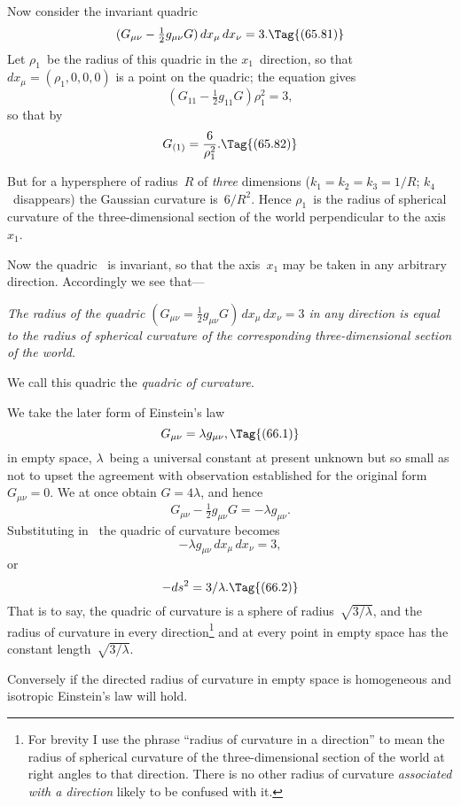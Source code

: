 \documentclass[12pt]{book}
\begin{document}
Now consider the invariant quadric
\[
(G_{\mu\nu} - \tfrac{1}{2} g_{\mu\nu} G)\, dx_{\mu}\, dx_{\nu} = 3.
\Tag{(65.81)}
\]
Let $\rho_{1}$~be the radius of this quadric in the $x_{1}$~direction, so that $dx_{\mu} = (\rho_{1} , 0, 0, 0)$
is a point on the quadric; the equation gives
\[
(G_{11} - \tfrac{1}{2} g_{11}G) \rho_{1}^{2} = 3,
\]
so that by~
\[
G_{(1)} = \frac{6}{\rho_{1}^{2}}.
\Tag{(65.82)}
\]

But for a hypersphere of radius~$R$ of \emph{three} dimensions ($k_{1} = k_{2} = k_{3} = 1/R$;
$k_{4}$~disappears) the Gaussian curvature is~$6/R^{2}$. Hence $\rho_{1}$~is the radius of
spherical curvature of the three\hyp{}dimensional section of the world perpendicular
to the axis~$x_{1}$.

Now the quadric~ is invariant, so that the axis~$x_{1}$ may be taken in
any arbitrary direction. Accordingly we see that---

\emph{The radius of the quadric $(G_{\mu\nu} = \tfrac{1}{2} g_{\mu\nu}G)\, dx_{\mu}\, dx_{\nu} = 3$ in any direction is equal
to the radius of spherical curvature of the corresponding three\hyp{}dimensional
section of the world.}

We call this quadric the \emph{quadric of curvature}.
%


We take the later form of Einstein's law~
\[
G_{\mu\nu} = \lambda g_{\mu\nu},
\Tag{(66.1)}
\]
in empty space, $\lambda$~being a universal constant at present unknown but so small
as not to upset the agreement with observation established for the original
form $G_{\mu\nu} = 0$. We at once obtain $G = 4\lambda$, and hence
\[
G_{\mu\nu} - \tfrac{1}{2} g_{\mu\nu} G = -\lambda g_{\mu\nu}.
\]
Substituting in~ the quadric of curvature becomes
\[
-\lambda g_{\mu\nu}\, dx_{\mu}\, dx_{\nu} = 3,
\]
or
\[
-ds^{2} = 3/\lambda.
\Tag{(66.2)}
\]
That is to say, the quadric of curvature is a sphere of radius~$\sqrt{3/\lambda}$, and the
radius of curvature in every direction\footnote
  {For brevity I use the phrase ``radius of curvature in a direction'' to mean the radius of
  spherical curvature of the three\hyp{}dimensional section of the world at right angles to that direction.
  There is no other radius of curvature \emph{associated with a direction} likely to be confused with it.}
and at every point in empty space has
the constant length~$\sqrt{3/\lambda}$.

Conversely if the directed radius of curvature in empty space is homogeneous
and isotropic Einstein's law will hold.
\end{document}
